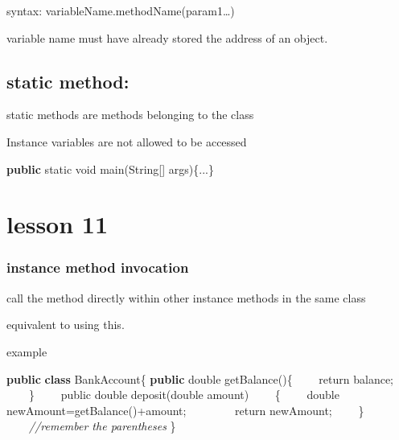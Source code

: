 \documentclass[
  paper=a4,
  ,captions=tableheading
]{scrartcl}
\newenvironment{Shaded}{}{}
\newcommand{\BuiltInTok}[1]{#1}
\newcommand{\CommentTok}[1]{\textcolor[rgb]{0.38,0.63,0.69}{\textit{#1}}}
\newcommand{\DataTypeTok}[1]{\textcolor[rgb]{0.56,0.13,0.00}{#1}}
\newcommand{\FunctionTok}[1]{\textcolor[rgb]{0.02,0.16,0.49}{#1}}
\newcommand{\KeywordTok}[1]{\textcolor[rgb]{0.00,0.44,0.13}{\textbf{#1}}}
\newcommand{\NormalTok}[1]{#1}
\begin{document}
syntax: variableName.methodName(param1\ldots{})

variable name must have already stored the address of an object.

\hypertarget{static-method}{%
\subsection{static method:}\label{static-method}}

static methods are methods belonging to the class

Instance variables are not allowed to be accessed

\begin{Shaded}
\begin{Highlighting}[]
\KeywordTok{public} \DataTypeTok{static} \DataTypeTok{void} \FunctionTok{main}\NormalTok{(}\BuiltInTok{String}\NormalTok{[] args)\{...\}}
\end{Highlighting}
\end{Shaded}

\hypertarget{lesson-11}{%
\section{lesson 11}\label{lesson-11}}

\hypertarget{instance-method-invocation}{%
\subsubsection{instance method
invocation}\label{instance-method-invocation}}

call the method directly within other instance methods in the same class

equivalent to using this.

example

\begin{Shaded}
\begin{Highlighting}[]
\KeywordTok{public} \KeywordTok{class}\NormalTok{ BankAccount\{}
    \KeywordTok{public} \DataTypeTok{double} \FunctionTok{getBalance}\NormalTok{()\{}
\NormalTok{        return balance;}
\NormalTok{    \}}
\NormalTok{    public }\DataTypeTok{double} \FunctionTok{deposit}\NormalTok{(}\DataTypeTok{double}\NormalTok{ amount)}
\NormalTok{    \{}
\NormalTok{        double newAmount=}\FunctionTok{getBalance}\NormalTok{()+amount;}
\NormalTok{        return newAmount;}
\NormalTok{    \}}
    \CommentTok{//remember the parentheses}
\NormalTok{\}}
\end{Highlighting}
\end{Shaded}
\end{document}
